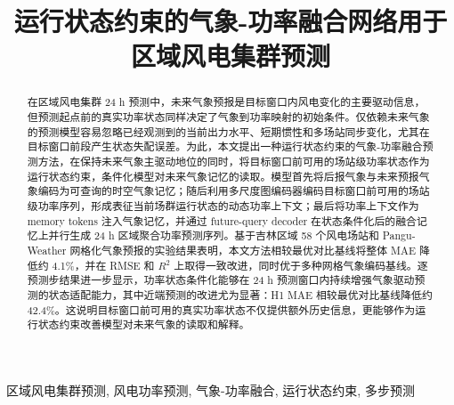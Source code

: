 \documentclass[conference]{IEEEtran}
\begin{document}
\title{运行状态约束的气象-功率融合网络用于区域风电集群预测}

\author{
}

\maketitle

\begin{abstract}
在区域风电集群 24 h 预测中，未来气象预报是目标窗口内风电变化的主要驱动信息，但预测起点前的真实功率状态同样决定了气象到功率映射的初始条件。仅依赖未来气象的预测模型容易忽略已经观测到的当前出力水平、短期惯性和多场站同步变化，尤其在目标窗口前段产生状态失配误差。为此，本文提出一种运行状态约束的气象-功率融合预测方法，在保持未来气象主驱动地位的同时，将目标窗口前可用的场站级功率状态作为运行状态约束，条件化模型对未来气象记忆的读取。模型首先将后报气象与未来预报气象编码为可查询的时空气象记忆；随后利用多尺度图编码器编码目标窗口前可用的场站级功率序列，形成表征当前场群运行状态的动态功率上下文；最后将功率上下文作为 memory tokens 注入气象记忆，并通过 future-query decoder 在状态条件化后的融合记忆上并行生成 24 h 区域聚合功率预测序列。基于吉林区域 58 个风电场站和 Pangu-Weather 网格化气象预报的实验结果表明，本文方法相较最优对比基线将整体 MAE 降低约 4.1\%，并在 RMSE 和 \(R^2\) 上取得一致改进，同时优于多种网格气象编码基线。逐预测步结果进一步显示，功率状态条件化能够在 24 h 预测窗口内持续增强气象驱动预测的状态适配能力，其中近端预测的改进尤为显著：H1 MAE 相较最优对比基线降低约 42.4\%。这说明目标窗口前可用的真实功率状态不仅提供额外历史信息，更能够作为运行状态约束改善模型对未来气象的读取和解释。
\end{abstract}

\begin{IEEEkeywords}
区域风电集群预测, 风电功率预测, 气象-功率融合, 运行状态约束, 多步预测
\end{IEEEkeywords}








\end{document}
